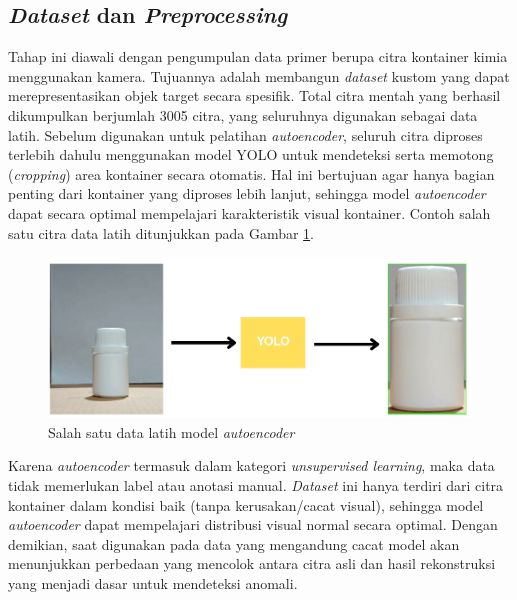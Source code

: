 \vspace{1em}

\subsection{\textit{Dataset} dan \textit{Preprocessing}}
Tahap ini diawali dengan pengumpulan data primer berupa citra
kontainer kimia menggunakan kamera. Tujuannya adalah membangun
\textit{dataset} kustom yang dapat merepresentasikan objek target secara
spesifik. Total citra mentah yang berhasil dikumpulkan berjumlah 3005
citra, yang seluruhnya digunakan sebagai data latih. Sebelum
digunakan untuk pelatihan \textit{autoencoder}, seluruh citra diproses
terlebih dahulu menggunakan model YOLO untuk mendeteksi serta
memotong (\textit{cropping}) area kontainer secara
otomatis. Hal ini bertujuan agar hanya bagian penting dari kontainer
yang diproses lebih lanjut, sehingga model \textit{autoencoder} dapat
secara optimal mempelajari karakteristik visual kontainer. Contoh
salah satu citra data latih ditunjukkan pada Gambar \ref{fig:ae-data}.

\begin{figure}[H]
  \centering
  \includegraphics[width=\textwidth]{gambar/ae_data.png}
  \caption{Salah satu data latih model \textit{autoencoder}}
  \label{fig:ae-data}
\end{figure}
\vspace{-1em}

Karena \textit{autoencoder} termasuk dalam kategori
\textit{unsupervised learning},
maka data tidak memerlukan label atau anotasi manual. \textit{Dataset} ini
hanya terdiri dari citra kontainer dalam kondisi baik (tanpa
kerusakan/cacat visual), sehingga model \textit{autoencoder} dapat mempelajari
distribusi visual normal secara optimal. Dengan demikian, saat
digunakan pada data yang mengandung cacat model akan menunjukkan
perbedaan yang mencolok antara citra asli dan hasil rekonstruksi yang
menjadi dasar untuk mendeteksi anomali.

\vspace{1em}

